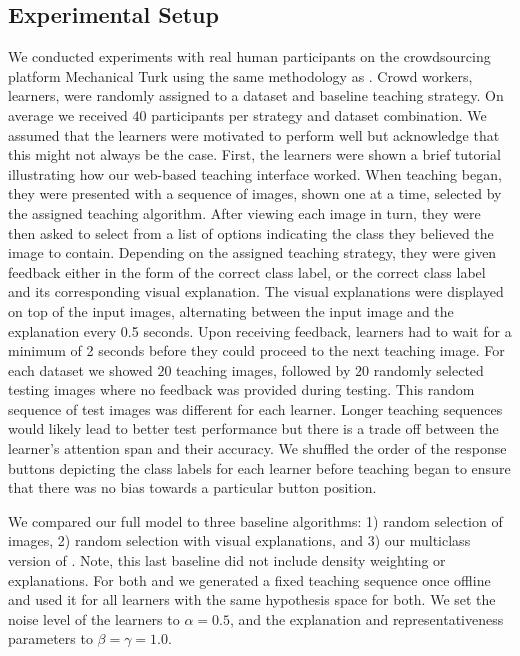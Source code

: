 \documentclass[../main.tex]{subfiles}
\begin{document}
\subsection{Experimental Setup}
We conducted experiments with real human participants on the crowdsourcing platform Mechanical Turk using the same methodology as \cite{singla2014near, johns2015}. 
Crowd workers, \ie learners, were randomly assigned to a dataset and baseline teaching strategy. 
On average we received $40$ participants per strategy and dataset combination. 
We assumed that the learners were motivated to perform well but acknowledge that this might not always be the case. 
First, the learners were shown a brief tutorial illustrating how our web-based teaching interface worked. 
When teaching began, they were presented with a sequence of images, shown one at a time, selected by the assigned teaching algorithm.
After viewing each image in turn, they were then asked to select from a list of options indicating the class they believed the image to contain.
Depending on the assigned teaching strategy, they were given feedback either in the form of the correct class label, or the correct class label and its corresponding visual explanation.
The visual explanations were displayed on top of the input images, alternating between the input image and the explanation every 0.5 seconds. 
Upon receiving feedback, learners had to wait for a minimum of 2 seconds before they could proceed to the next teaching image. 
For each dataset we showed $20$ teaching images, followed by $20$ randomly selected testing images where no feedback was provided during testing. 
This random sequence of test images was different for each learner. 
Longer teaching sequences would likely lead to better test performance but there is a trade off between the learner's attention span and their accuracy. 
We shuffled the order of the response buttons depicting the class labels for each learner before teaching began to ensure that there was no bias towards a particular button position.

We compared our full \EXPLAIN model to three baseline algorithms: 1) \RANDIM random selection of images, 2) \RANDEXP random selection with visual explanations, and 3) our multiclass version of \STRICT \cite{singla2014near}. 
Note, this last baseline did not include density weighting or explanations.
For both \EXPLAIN and \STRICT we generated a fixed teaching sequence once offline and used it for all learners with the same hypothesis space for both.
We set the noise level of the learners to $\alpha = 0.5$, and the explanation and representativeness parameters to $\beta = \gamma = 1.0$.
\end{document}

